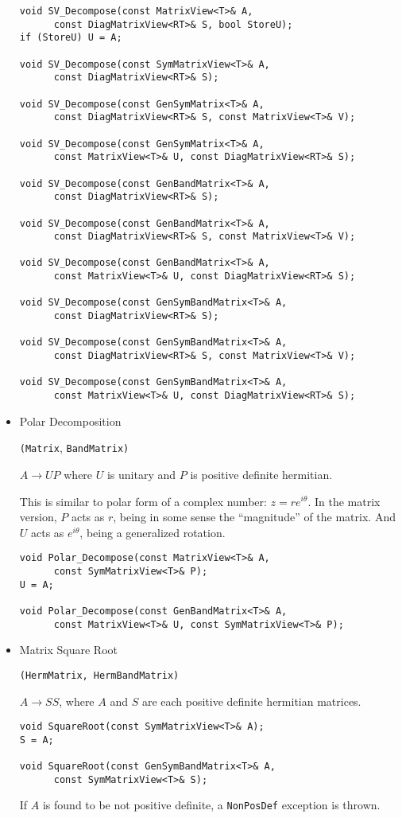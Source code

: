 \documentclass[twoside,letterpaper,11pt]{article}
\renewcommand{\tt}[1]{{\texttt {#1}}}
\begin{document}
\begin{itemize}
\begin{verbatim}
void SV_Decompose(const MatrixView<T>& A, 
      const DiagMatrixView<RT>& S, bool StoreU);
if (StoreU) U = A;

void SV_Decompose(const SymMatrixView<T>& A, 
      const DiagMatrixView<RT>& S);
      
void SV_Decompose(const GenSymMatrix<T>& A,
      const DiagMatrixView<RT>& S, const MatrixView<T>& V);
      
void SV_Decompose(const GenSymMatrix<T>& A,
      const MatrixView<T>& U, const DiagMatrixView<RT>& S);
      
void SV_Decompose(const GenBandMatrix<T>& A, 
      const DiagMatrixView<RT>& S);

void SV_Decompose(const GenBandMatrix<T>& A,
      const DiagMatrixView<RT>& S, const MatrixView<T>& V);
      
void SV_Decompose(const GenBandMatrix<T>& A,
      const MatrixView<T>& U, const DiagMatrixView<RT>& S);
      
void SV_Decompose(const GenSymBandMatrix<T>& A, 
      const DiagMatrixView<RT>& S);
      
void SV_Decompose(const GenSymBandMatrix<T>& A,
      const DiagMatrixView<RT>& S, const MatrixView<T>& V);

void SV_Decompose(const GenSymBandMatrix<T>& A,
      const MatrixView<T>& U, const DiagMatrixView<RT>& S);
\end{verbatim}

\item Polar Decomposition 

\tt{(Matrix}, \tt{BandMatrix)}

$A \rightarrow U P$ where $U$ is unitary and $P$ is positive definite hermitian.

This is similar to polar form of a complex number: $z = r e^{i \theta}$.
In the matrix version, $P$ acts as $r$, being in some sense the ``magnitude'' 
of the matrix.  And $U$ acts as $e^{i \theta}$, being a generalized rotation.

\begin{verbatim}
void Polar_Decompose(const MatrixView<T>& A, 
      const SymMatrixView<T>& P);
U = A;

void Polar_Decompose(const GenBandMatrix<T>& A,
      const MatrixView<T>& U, const SymMatrixView<T>& P);
\end{verbatim}

\item Matrix Square Root 

\tt{(HermMatrix, HermBandMatrix)}

$A \rightarrow S S$, where $A$ and $S$ are each positive definite hermitian matrices.

\begin{verbatim}
void SquareRoot(const SymMatrixView<T>& A);
S = A;

void SquareRoot(const GenSymBandMatrix<T>& A, 
      const SymMatrixView<T>& S);
\end{verbatim}

If $A$ is found to be not positive definite, a \tt{NonPosDef} exception is thrown.

\end{itemize}
\end{document}

